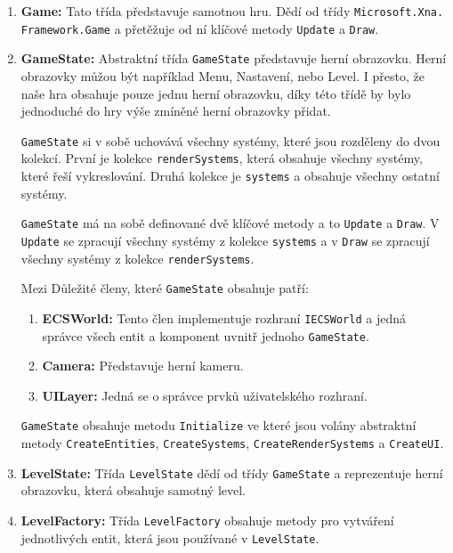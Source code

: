 \begin{enumerate}
    \item \textbf{Game:} Tato třída představuje samotnou hru. Dědí od třídy \verb|Microsoft.Xna.| \verb|Framework.Game| a přetěžuje od ní klíčové metody \verb|Update| a \verb|Draw|.

    \item \textbf{GameState:} Abstraktní třída \verb|GameState| představuje herní obrazovku. Herní obrazovky můžou být například Menu, Nastavení, nebo Level. I přesto, že naše hra obsahuje pouze jednu herní obrazovku, díky této třídě by bylo jednoduché do hry výše zmíněné herní obrazovky přidat.

    \verb|GameState| si v sobě uchovává všechny systémy, které jsou rozděleny do dvou kolekcí. První je kolekce \verb|renderSystems|, která obsahuje všechny systémy, které řeší vykreslování. Druhá kolekce je \verb|systems| a obsahuje všechny ostatní systémy.

    \verb|GameState| má na sobě definované dvě klíčové metody a to \verb|Update| a \verb|Draw|. V \verb|Update| se zpracují všechny systémy z kolekce \verb|systems| a v \verb|Draw| se zpracují všechny systémy z kolekce \verb|renderSystems|.

    Mezi Důležité členy, které \verb|GameState| obsahuje patří:

    \begin{enumerate}
        \item \textbf{ECSWorld:} Tento člen implementuje rozhraní \verb|IECSWorld| a jedná správce všech entit a komponent uvnitř jednoho \verb|GameState|.
        \item \textbf{Camera:} Představuje herní kameru.
        \item \textbf{UILayer:} Jedná se o správce prvků uživatelského rozhraní.
    \end{enumerate}

    \verb|GameState| obsahuje metodu \verb|Initialize| ve které jsou volány abstraktní metody \verb|CreateEntities|, \verb|CreateSystems|, \verb|CreateRenderSystems| a \verb|CreateUI|.

    \item \textbf{LevelState:} Třída \verb|LevelState| dědí od třídy \verb|GameState| a reprezentuje herní obrazovku, která obsahuje samotný level.

    \item \textbf{LevelFactory:} Třída \verb|LevelFactory| obsahuje metody pro vytváření jednotlivých entit, která jsou používané v \verb|LevelState|.
\end{enumerate}

